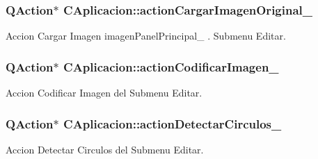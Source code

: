 \subsubsection[{\texorpdfstring{action\+Cargar\+Imagen\+Original\+\_\+}{actionCargarImagenOriginal_}}]{\setlength{\rightskip}{0pt plus 5cm}Q\+Action$\ast$ C\+Aplicacion\+::action\+Cargar\+Imagen\+Original\+\_\+\hspace{0.3cm}{\ttfamily [private]}}\hypertarget{classCAplicacion_a3768f71b55ac5e2d77fed775d8ebce74}{}\label{classCAplicacion_a3768f71b55ac5e2d77fed775d8ebce74}


Accion Cargar Imagen imagen\+Panel\+Principal\+\_\+ . Submenu Editar. 

\subsubsection[{\texorpdfstring{action\+Codificar\+Imagen\+\_\+}{actionCodificarImagen_}}]{\setlength{\rightskip}{0pt plus 5cm}Q\+Action$\ast$ C\+Aplicacion\+::action\+Codificar\+Imagen\+\_\+\hspace{0.3cm}{\ttfamily [private]}}\hypertarget{classCAplicacion_a06464c87dd4924cc8bb92f946239f603}{}\label{classCAplicacion_a06464c87dd4924cc8bb92f946239f603}


Accion Codificar Imagen del Submenu Editar. 

\subsubsection[{\texorpdfstring{action\+Detectar\+Circulos\+\_\+}{actionDetectarCirculos_}}]{\setlength{\rightskip}{0pt plus 5cm}Q\+Action$\ast$ C\+Aplicacion\+::action\+Detectar\+Circulos\+\_\+\hspace{0.3cm}{\ttfamily [private]}}\hypertarget{classCAplicacion_ab4c2fb6ecc5d7c21a1f181f0f0af2830}{}\label{classCAplicacion_ab4c2fb6ecc5d7c21a1f181f0f0af2830}


Accion Detectar Circulos del Submenu Editar. 


